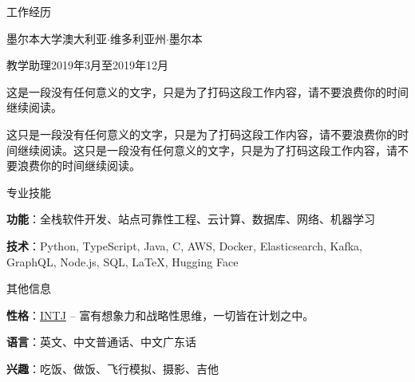 \documentclass{xsha}
\begin{document}
\begin{xsection}{工作经历}
\begin{xheading}{墨尔本大学}{澳大利亚$\cdot$维多利亚州$\cdot$墨尔本}
\begin{xsubheading}{教学助理}{2019年3月至2019年12月}
\item 这是一段没有任何意义的文字，只是为了打码这段工作内容，请不要浪费你的时间继续阅读。
\item 这只是一段没有任何意义的文字，只是为了打码这段工作内容，请不要浪费你的时间继续阅读。这只是一段没有任何意义的文字，只是为了打码这段工作内容，请不要浪费你的时间继续阅读。
\end{xsubheading}
\end{xheading}

\end{xsection}

\begin{xsection}{专业技能}
\item \textbf{功能}：全栈软件开发、站点可靠性工程、云计算、数据库、网络、机器学习
\item \textbf{技术}：Python, TypeScript, Java, C, AWS, Docker, Elasticsearch, Kafka, GraphQL, Node.js, SQL, \LaTeX, Hugging Face
\end{xsection}

\begin{xsection}{其他信息}
\item \textbf{性格}：\href{https://www.16personalities.com/intj-personality}{INTJ} -- 富有想象力和战略性思维，一切皆在计划之中。
\item \textbf{语言}：英文、中文普通话、中文广东话
\item \textbf{兴趣}：吃饭、做饭、飞行模拟、摄影、吉他
\end{xsection}
\end{document}
